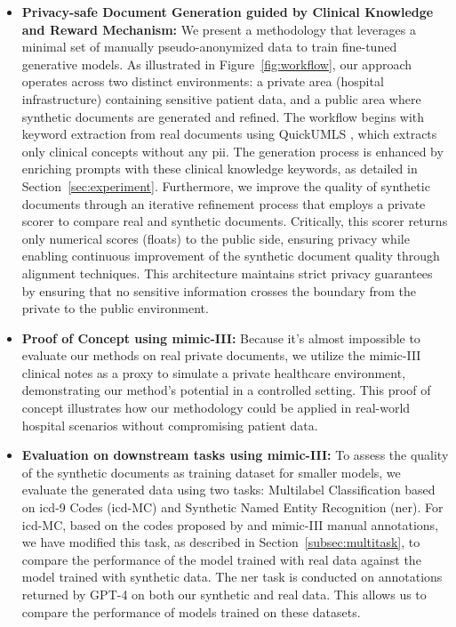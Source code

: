 \begin{itemize}
\item \textbf{Privacy-safe Document Generation guided by Clinical Knowledge and Reward Mechanism:} We present a methodology that leverages a minimal set of manually pseudo-anonymized data to train fine-tuned generative models. As illustrated in Figure~\ref{fig:workflow}, our approach operates across two distinct environments: a private area (hospital infrastructure) containing sensitive patient data, and a public area where synthetic documents are generated and refined. The workflow begins with keyword extraction from real documents using QuickUMLS \citep{soldainiQuickUMLSFastUnsupervised2016}, which extracts only clinical concepts without any \gls{pii}. The generation process is enhanced by enriching prompts with these clinical knowledge keywords, as detailed in Section~\ref{sec:experiment}. Furthermore, we improve the quality of synthetic documents through an iterative refinement process that employs a private scorer to compare real and synthetic documents. Critically, this scorer returns only numerical scores (floats) to the public side, ensuring privacy while enabling continuous improvement of the synthetic document quality through alignment techniques. This architecture maintains strict privacy guarantees by ensuring that no sensitive information crosses the boundary from the private to the public environment.

\item \textbf{Proof of Concept using \gls{mimic}-III:} Because it's almost impossible to evaluate our methods on real private documents, we utilize the \gls{mimic}-III clinical notes \citep{Johnson2016MIMIC-IIIDatabase} as a proxy to simulate a private healthcare environment, demonstrating our method's potential in a controlled setting. This proof of concept illustrates how our methodology could be applied in real-world hospital scenarios without compromising patient data.

\item \textbf{Evaluation on downstream tasks using \gls{mimic}-III:} To assess the quality of the synthetic documents as training dataset for smaller models, we evaluate the generated data using two tasks: Multilabel Classification based on \gls{icd}-9 Codes (\gls{icd}-MC) and Synthetic Named Entity Recognition (\gls{ner}). For \gls{icd}-MC, based on the codes proposed by \citet{mullenbach_explainable_2018} and \gls{mimic}-III manual annotations, we have modified this task, as described in Section~\ref{subsec:multitask}, to compare the performance of the model trained with real data against the model trained with synthetic data. The \gls{ner} task is conducted on annotations returned by GPT-4 on both our synthetic and real data. This allows us to compare the performance of models trained on these datasets.
\end{itemize}

